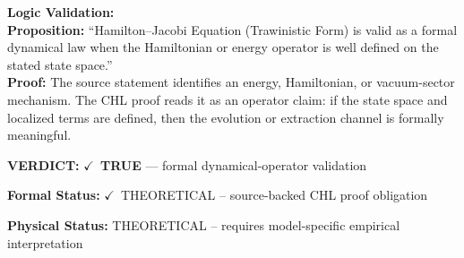 \textbf{Logic Validation:}\\
\textbf{Proposition:} ``Hamilton--Jacobi Equation (Trawinistic Form) is valid as a formal dynamical law when the
Hamiltonian or energy operator is well defined on the stated state space.''\\
\textbf{Proof:} The source statement identifies an energy, Hamiltonian, or vacuum-sector mechanism. The
CHL proof reads it as an operator claim: if the state space and localized terms are
defined, then the evolution or extraction channel is formally meaningful.

\textbf{VERDICT:} \ensuremath{\checkmark}\ \textbf{TRUE} --- formal dynamical-operator validation

\textbf{Formal Status:} \ensuremath{\checkmark}\ THEORETICAL -- source-backed CHL proof obligation

\textbf{Physical Status:} THEORETICAL -- requires model-specific empirical interpretation
\par\vspace{0.45em}
\par
\ifTZPDarkEdition
{}
\fi
\endgroup
\endgroup
